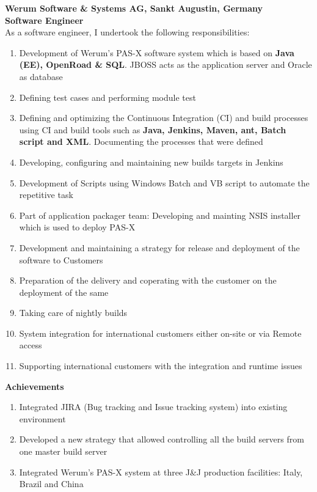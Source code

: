 \documentclass[11.9pt]{xetexCV}
\begin{document}
\textbf{{\color{bluesubheading}Werum Software \& Systems AG, Sankt Augustin, Germany}} \\
\vspace{1.5mm}%
\textbf{{\color{bluesubheading}Software Engineer}}\\
As a software engineer, I undertook the following responsibilities:
\begin{enumerate}[leftmargin=4.5cm,label=\textbullet]
\item Development of Werum’s PAS-X software system which is based on \textbf{Java (EE), OpenRoad \& SQL}. JBOSS acts as the application server and Oracle as database
\item Defining test cases and performing module test
\item Defining and optimizing the Continuous Integration (CI) and build processes using CI and build tools such as \textbf{Java, Jenkins, Maven, ant, Batch script and XML}. Documenting the processes that were defined
\item Developing, configuring and maintaining new builds targets in Jenkins
\item Development of Scripts using Windows Batch and VB script to automate the repetitive task
\item Part of application packager team: Developing and mainting NSIS installer which is used to deploy PAS-X
\item Development and maintaining a strategy for release and deployment of the software to Customers
\item Preparation of the delivery and coperating with the customer on the deployment of the same 
\item Taking care of nightly builds
\item System integration for international customers either on-site or via Remote access
\item Supporting international customers with the integration and runtime issues
\end{enumerate}

\textbf{{\color{bluesubheading}Achievements}}
\begin{enumerate}[leftmargin=4.5cm,label=\textbullet]
\item Integrated JIRA (Bug tracking and Issue tracking system) into existing environment
\item Developed a new strategy that allowed controlling all the build servers from one master build server
\item Integrated Werum’s PAS-X system at three J\&J production facilities: Italy, Brazil and China
\end{enumerate}
\end{document}

